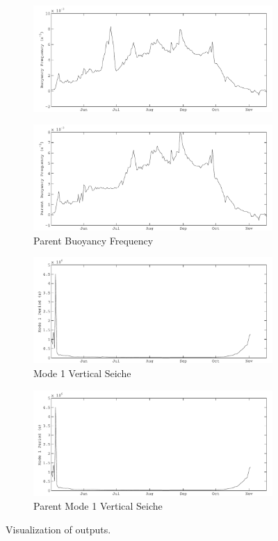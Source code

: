 \begin{figure}
\begin{subfigure}{\lafigsize}
			\includegraphics[width=\textwidth]{figures/Sparkling_N2.pdf}
		\end{subfigure}
		\begin{subfigure}{\lafigsize}
			\caption{Parent Buoyancy Frequency}
			\includegraphics[width=\textwidth]{figures/Sparkling_SN2.pdf}
		\end{subfigure}
		\begin{subfigure}{\lafigsize}
			\caption{Mode 1 Vertical Seiche}
			\includegraphics[width=\textwidth]{figures/Sparkling_T1.pdf}
		\end{subfigure}
		\begin{subfigure}{\lafigsize}
			\caption{Parent Mode 1 Vertical Seiche}
			\includegraphics[width=\textwidth]{figures/Sparkling_ST1.pdf}
		\end{subfigure}
		\caption{Visualization of \la outputs.}
	\end{figure}
